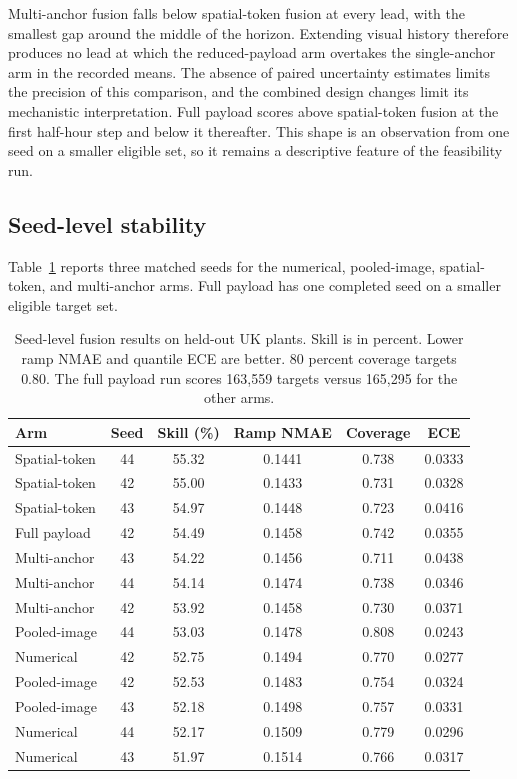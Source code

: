 Multi-anchor fusion falls below spatial-token fusion at every lead, with the smallest gap around the middle of the horizon. Extending visual history therefore produces no lead at which the reduced-payload arm overtakes the single-anchor arm in the recorded means. The absence of paired uncertainty estimates limits the precision of this comparison, and the combined design changes limit its mechanistic interpretation. Full payload scores above spatial-token fusion at the first half-hour step and below it thereafter. This shape is an observation from one seed on a smaller eligible set, so it remains a descriptive feature of the feasibility run.

\subsection{Seed-level stability}

Table~\ref{tab:seed-level-ladder} reports three matched seeds for the numerical, pooled-image, spatial-token, and multi-anchor arms. Full payload has one completed seed on a smaller eligible target set.

\begin{table}[htbp]
\centering
\begin{tabular}{lccccc}
\hline
Arm & Seed & Skill (\%) & Ramp NMAE & Coverage & ECE \\
\hline
Spatial-token & 44 & 55.32 & 0.1441 & 0.738 & 0.0333 \\
Spatial-token & 42 & 55.00 & 0.1433 & 0.731 & 0.0328 \\
Spatial-token & 43 & 54.97 & 0.1448 & 0.723 & 0.0416 \\
Full payload & 42 & 54.49 & 0.1458 & 0.742 & 0.0355 \\
Multi-anchor & 43 & 54.22 & 0.1456 & 0.711 & 0.0438 \\
Multi-anchor & 44 & 54.14 & 0.1474 & 0.738 & 0.0346 \\
Multi-anchor & 42 & 53.92 & 0.1458 & 0.730 & 0.0371 \\
Pooled-image & 44 & 53.03 & 0.1478 & 0.808 & 0.0243 \\
Numerical & 42 & 52.75 & 0.1494 & 0.770 & 0.0277 \\
Pooled-image & 42 & 52.53 & 0.1483 & 0.754 & 0.0324 \\
Pooled-image & 43 & 52.18 & 0.1498 & 0.757 & 0.0331 \\
Numerical & 44 & 52.17 & 0.1509 & 0.779 & 0.0296 \\
Numerical & 43 & 51.97 & 0.1514 & 0.766 & 0.0317 \\
\hline
\end{tabular}
\caption{Seed-level fusion results on held-out UK plants. Skill is in percent. Lower ramp NMAE and quantile ECE are better. 80 percent coverage targets 0.80. The full payload run scores 163,559 targets versus 165,295 for the other arms.}
\label{tab:seed-level-ladder}
\end{table}

